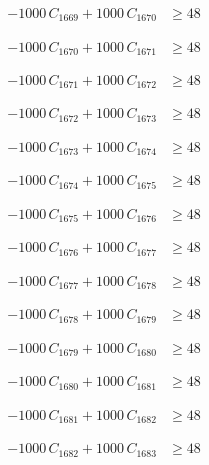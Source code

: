 \documentclass[a4paper,11pt]{article}
\begin{document}
\begin{align}
-1000\,C_{1669} + 1000\,C_{1670} &\geq 48 \nonumber
\end{align}

\begin{align}
-1000\,C_{1670} + 1000\,C_{1671} &\geq 48 \nonumber
\end{align}

\begin{align}
-1000\,C_{1671} + 1000\,C_{1672} &\geq 48 \nonumber
\end{align}

\begin{align}
-1000\,C_{1672} + 1000\,C_{1673} &\geq 48 \nonumber
\end{align}

\begin{align}
-1000\,C_{1673} + 1000\,C_{1674} &\geq 48 \nonumber
\end{align}

\begin{align}
-1000\,C_{1674} + 1000\,C_{1675} &\geq 48 \nonumber
\end{align}

\begin{align}
-1000\,C_{1675} + 1000\,C_{1676} &\geq 48 \nonumber
\end{align}

\begin{align}
-1000\,C_{1676} + 1000\,C_{1677} &\geq 48 \nonumber
\end{align}

\begin{align}
-1000\,C_{1677} + 1000\,C_{1678} &\geq 48 \nonumber
\end{align}

\begin{align}
-1000\,C_{1678} + 1000\,C_{1679} &\geq 48 \nonumber
\end{align}

\begin{align}
-1000\,C_{1679} + 1000\,C_{1680} &\geq 48 \nonumber
\end{align}

\begin{align}
-1000\,C_{1680} + 1000\,C_{1681} &\geq 48 \nonumber
\end{align}

\begin{align}
-1000\,C_{1681} + 1000\,C_{1682} &\geq 48 \nonumber
\end{align}

\begin{align}
-1000\,C_{1682} + 1000\,C_{1683} &\geq 48 \nonumber
\end{align}
\end{document}
